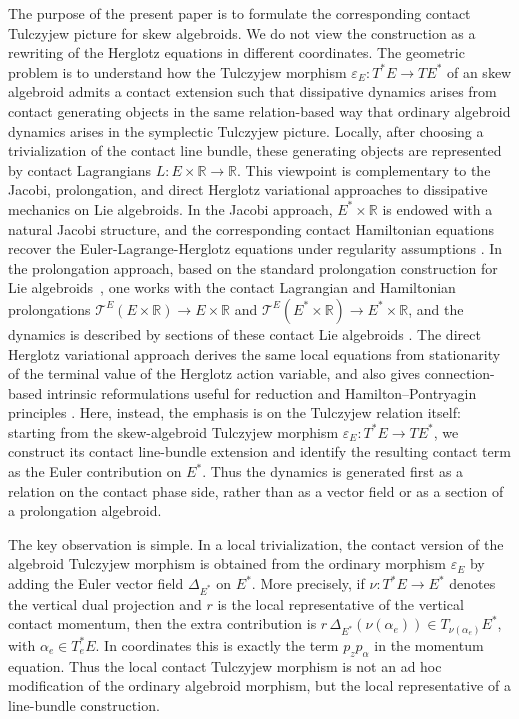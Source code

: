 \documentclass[11pt]{article}
\begin{document}
The purpose of the present paper is to formulate the corresponding contact
Tulczyjew picture for skew algebroids. We do not view the construction as a
rewriting of the Herglotz equations in different coordinates. The geometric
problem is to understand how the Tulczyjew morphism
$\varepsilon_E:T^*E\to TE^{*}$ of an skew algebroid admits a contact extension such that dissipative dynamics
arises from contact generating objects in the same relation-based way that
ordinary algebroid dynamics arises in the symplectic Tulczyjew picture. Locally,
after choosing a trivialization of the contact line bundle, these generating
objects are represented by contact Lagrangians $L:E\times\mathbb R\to\mathbb R$.
This viewpoint is complementary to the Jacobi, prolongation, and direct
Herglotz variational approaches to dissipative mechanics on Lie algebroids. In
the Jacobi approach, \(E^*\times\mathbb R\) is endowed with a natural Jacobi
structure, and the corresponding contact Hamiltonian equations recover the
Euler-Lagrange-Herglotz equations under regularity assumptions
\cite{ASCLMS2024}. In the prolongation approach, based on the standard prolongation construction for Lie algebroids~\cite{Martinez2001}, one works with the contact Lagrangian and Hamiltonian prolongations $ \mathcal T^E(E\times \mathbb R)\rightarrow E\times \mathbb R$ and $\mathcal T^E(E^*\times \mathbb R)\rightarrow E^*\times \mathbb R$, and the dynamics is described by sections of these contact Lie algebroids \cite{SimoesColomboDeLeonSalgadoSouto2025Annali}. The direct Herglotz
variational approach derives the same local equations from stationarity of the
terminal value of the Herglotz action variable, and also gives
connection-based intrinsic reformulations useful for reduction and
Hamilton--Pontryagin principles
\cite{SimoesColombo2026}. Here, instead, the emphasis is on the
Tulczyjew relation itself: starting from the skew-algebroid Tulczyjew morphism
\(\varepsilon_E:T^*E\to TE^*\), we construct its contact line-bundle extension
and identify the resulting contact term as the Euler contribution on \(E^*\).
Thus the dynamics is generated first as a relation on the contact phase side,
rather than as a vector field or as a section of a prolongation algebroid.

The key observation is simple. In a local trivialization, the contact version of
the algebroid Tulczyjew morphism is obtained from the ordinary morphism \(\varepsilon_E\) by adding the Euler vector field $\Delta_{E^*}$ on \(E^*\). More precisely, if
\(\nu:T^*E\to E^*\) denotes the vertical dual projection and \(r\) is the local
representative of the vertical contact momentum, then the extra contribution is $r\,\Delta_{E^*}(\nu(\alpha_e))\in T_{\nu(\alpha_e)}E^*$, with \(\alpha_e\in T^*_eE\).
In coordinates this is exactly the term \(p_zp_\alpha\) in the momentum equation.
Thus the local contact Tulczyjew morphism is not an ad hoc modification of the
ordinary algebroid morphism, but the local representative of a line-bundle
construction.
\end{document}
